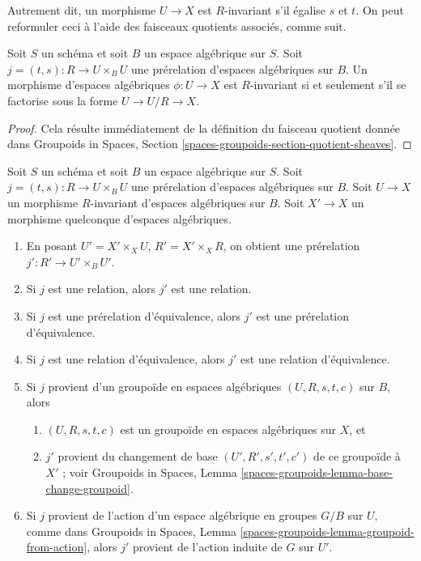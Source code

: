 \noindent
Autrement dit, un morphisme $U \to X$ est $R$-invariant s'il égalise
$s$ et $t$. On peut reformuler ceci à l'aide des faisceaux quotients
associés, comme suit.

\begin{lemma}
\label{lemma-invariant}
Soit $S$ un schéma et soit $B$ un espace algébrique sur $S$.
Soit $j = (t, s) : R \to U \times_B U$ une prérelation d'espaces
algébriques sur $B$. Un morphisme d'espaces algébriques $\phi : U \to X$ est
$R$-invariant si et seulement s'il se factorise sous la forme
$U \to U/R \to X$.
\end{lemma}

\begin{proof}
Cela résulte immédiatement de la définition du faisceau quotient donnée dans
Groupoids in Spaces, Section \ref{spaces-groupoids-section-quotient-sheaves}.
\end{proof}

\begin{lemma}
\label{lemma-base-change-on-invariant}
Soit $S$ un schéma et soit $B$ un espace algébrique sur $S$.
Soit $j = (t, s) : R \to U \times_B U$ une prérelation d'espaces
algébriques sur $B$. Soit $U \to X$ un morphisme $R$-invariant d'espaces
algébriques sur $B$. Soit $X' \to X$ un morphisme quelconque d'espaces algébriques.
\begin{enumerate}
\item En posant $U' = X' \times_X U$, $R' = X' \times_X R$, on obtient
une prérelation $j' : R' \to U' \times_B U'$.
\item Si $j$ est une relation, alors $j'$ est une relation.
\item Si $j$ est une prérelation d'équivalence, alors $j'$ est une
prérelation d'équivalence.
\item Si $j$ est une relation d'équivalence, alors $j'$ est une relation
d'équivalence.
\item Si $j$ provient d'un groupoïde en espaces algébriques
$(U, R, s, t, c)$ sur $B$, alors
\begin{enumerate}
\item $(U, R, s, t, c)$ est un groupoïde en espaces algébriques sur $X$, et
\item $j'$ provient du changement de base $(U', R', s', t', c')$
de ce groupoïde à $X'$ ; voir
Groupoids in Spaces, Lemma
\ref{spaces-groupoids-lemma-base-change-groupoid}.
\end{enumerate}
\item Si $j$ provient de l'action d'un espace algébrique en groupes $G/B$ sur $U$,
comme dans Groupoids in Spaces, Lemma
\ref{spaces-groupoids-lemma-groupoid-from-action},
alors $j'$ provient de l'action induite de $G$ sur $U'$.
\end{enumerate}
\end{lemma}


